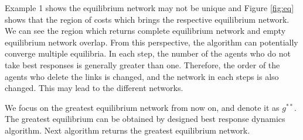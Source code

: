 \documentclass[12pt]{article}
\theoremstyle{definition}
\begin{document}
Example 1 shows the equilibrium network may not be unique and Figure \ref{fig:eq} shows that the region of costs which brings the respective equilibrium network.
We can see the region which returns complete equilibrium network and empty equilibrium network overlap.
From this perspective, the algorithm can potentially converge multiple equilibria.
In each step, the number of the agents who do not take best responses is generally greater than one.
Therefore, the order of the agents who delete the links is changed, and the network in each steps is also changed.
This may lead to the different networks.

We focus on the greatest equilibrium network from now on, and denote it as $g^{**}$.
The greatest equilibrium can be obtained by designed best response dynamics algorithm.
Next algorithm returns the greatest equilibrium network.
\end{document}
